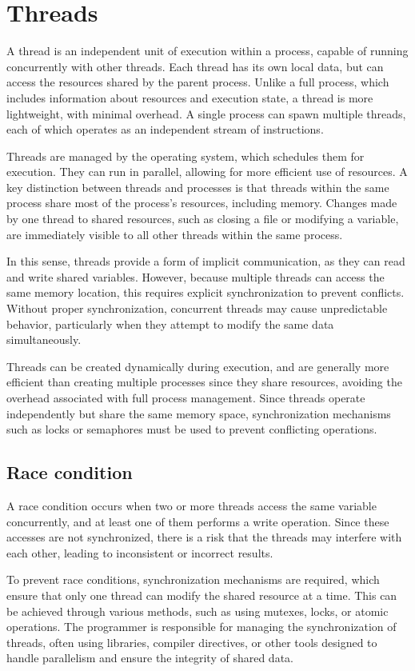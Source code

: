 \section{Threads}

A thread is an independent unit of execution within a process, capable of running concurrently with other threads. 
Each thread has its own local data, but can access the resources shared by the parent process. 
Unlike a full process, which includes information about resources and execution state, a thread is more lightweight, with minimal overhead. 
A single process can spawn multiple threads, each of which operates as an independent stream of instructions.

Threads are managed by the operating system, which schedules them for execution. 
They can run in parallel, allowing for more efficient use of resources. 
A key distinction between threads and processes is that threads within the same process share most of the process's resources, including memory. 
Changes made by one thread to shared resources, such as closing a file or modifying a variable, are immediately visible to all other threads within the same process.

In this sense, threads provide a form of implicit communication, as they can read and write shared variables. 
However, because multiple threads can access the same memory location, this requires explicit synchronization to prevent conflicts. 
Without proper synchronization, concurrent threads may cause unpredictable behavior, particularly when they attempt to modify the same data simultaneously.

Threads can be created dynamically during execution, and are generally more efficient than creating multiple processes since they share resources, avoiding the overhead associated with full process management. 
Since threads operate independently but share the same memory space, synchronization mechanisms such as locks or semaphores must be used to prevent conflicting operations.

\subsection{Race condition}
A race condition occurs when two or more threads access the same variable concurrently, and at least one of them performs a write operation. 
Since these accesses are not synchronized, there is a risk that the threads may interfere with each other, leading to inconsistent or incorrect results. 

To prevent race conditions, synchronization mechanisms are required, which ensure that only one thread can modify the shared resource at a time.
This can be achieved through various methods, such as using mutexes, locks, or atomic operations. 
The programmer is responsible for managing the synchronization of threads, often using libraries, compiler directives, or other tools designed to handle parallelism and ensure the integrity of shared data.